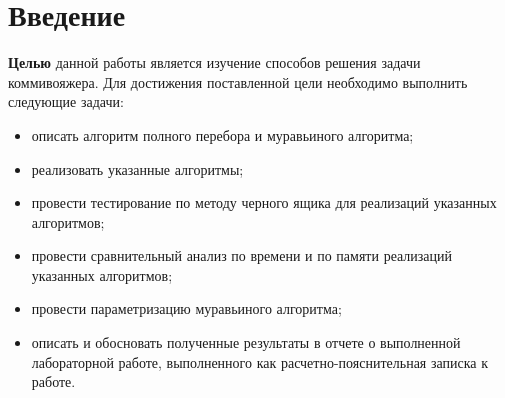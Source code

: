 \chapter*{Введение}

\textbf{Целью} данной работы является изучение способов решения задачи коммивояжера. Для достижения поставленной цели необходимо выполнить следующие задачи:
\begin{itemize}[label=---]
	\item описать алгоритм полного перебора и муравьиного алгоритма;
	\item реализовать указанные алгоритмы;
	
	\item провести тестирование по методу черного ящика для реализаций указанных алгоритмов;
	
	\item провести сравнительный анализ по времени и по памяти реализаций указанных алгоритмов;
	
	\item провести параметризацию муравьиного алгоритма;
	
	\item описать и обосновать полученные результаты в отчете о выполненной лабораторной работе, выполненного как расчетно-пояснительная записка к работе.
\end{itemize}